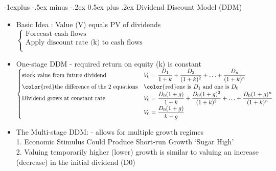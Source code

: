 \documentclass[10pt,landscape]{article}
\makeatletter
\renewcommand{\subsection}{\@startsection{subsection}{2}{0mm}%
                                {-1explus -.5ex minus -.2ex}%
                                {0.5ex plus .2ex}%
                                {\normalfont\normalsize\bfseries}}
\makeatother
\begin{document}
\begin{multicols}{2}
\begin{itemize}
    \end{itemize}

    \subsection{Dividend Discount Model (DDM)}
    \begin{itemize}
        \item Basic Idea : Value (V) equals PV of dividends\\
        	$
            \begin{cases}
                \text{Forecast cash flows}\\
                \text{Apply discount rate (k) to cash flows}\\
            \end{cases}
            $
        \item One-stage DDM - required return on equity (k) is constant\\
        	$
            \begin{cases}
                \text{stock value from future dividend}& \displaystyle V_0=\frac{D_1}{1+k}+\frac{D_2}{(1+k)^2}+\ldots+\frac{D_n}{(1+k)^n}\\
                \text{\color{red}the difference of the 2 equations}& \text{\color{red}one is $D_1$ and one is $D_0$}\\
                \text{Dividend grows at constant rate}& \displaystyle V_0=\frac{D_0(1+g)}{1+k}+\frac{D_0(1+g)^2}{(1+k)^2}+\ldots+\frac{D_0(1+g)^n}{(1+k)^n}\\
                \text{} & \displaystyle V_0=\frac{D_0(1+g)}{k-g}\\
            \end{cases}
            $
        \item The Multi-stage DDM: - allows for multiple growth regimes\\
        	1. Economic Stimulus Could Produce Short-run Growth ‘Sugar High’\\
        	2. Valuing temporarily higher (lower) growth is similar to valuing an increase (decrease) in the initial dividend (D0)
        
    \end{itemize}



\end{multicols}
\end{document}
